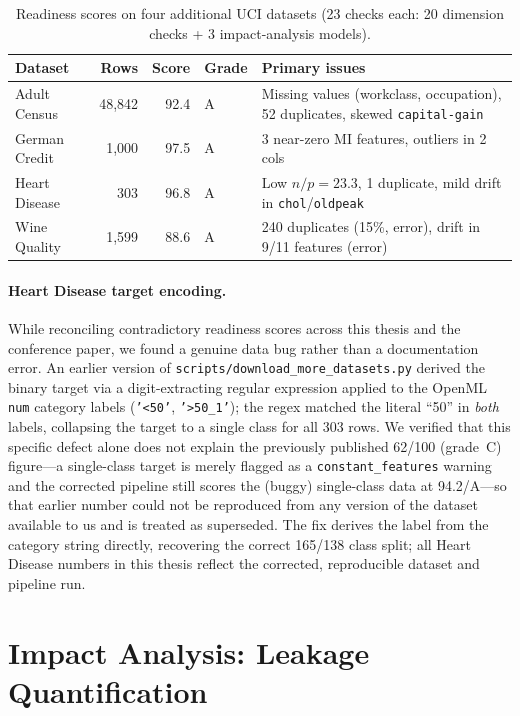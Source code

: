 \documentclass[12pt,a4paper]{report}
\newcommand{\tblhead}{\rowcolor{tblHeadBg}\color{white}\bfseries}
\begin{document}
\begin{table}[!ht]
\centering
\caption{Readiness scores on four additional UCI datasets (23 checks each: 20 dimension
  checks + 3 impact-analysis models).}
\label{tab:uci}
\begin{tabularx}{\textwidth}{lrrlX}
\toprule
\tblhead \textbf{Dataset} & \textbf{Rows} & \textbf{Score} & \textbf{Grade} & \textbf{Primary issues} \\
\midrule
Adult Census     & 48,842 & 92.4 & A & Missing values (workclass, occupation), 52 duplicates, skewed \texttt{capital-gain} \\
German Credit    & 1,000  & 97.5 & A & 3 near-zero MI features, outliers in 2 cols \\
Heart Disease    & 303    & 96.8 & A & Low $n/p{=}23.3$, 1 duplicate, mild drift in \texttt{chol}/\texttt{oldpeak} \\
Wine Quality     & 1,599  & 88.6 & A & 240 duplicates (15\%, error), drift in 9/11 features (error) \\
\bottomrule
\end{tabularx}
\end{table}

\paragraph{Heart Disease target encoding.}
While reconciling contradictory readiness scores across this thesis and the conference
paper, we found a genuine data bug rather than a documentation error.  An earlier version
of \texttt{scripts/download\_more\_datasets.py} derived the binary target via a
digit-extracting regular expression applied to the OpenML \texttt{num} category labels
(\texttt{'<50'}, \texttt{'>50\_1'}); the regex matched the literal ``50'' in \emph{both}
labels, collapsing the target to a single class for all 303 rows.  We verified that this
specific defect alone does not explain the previously published 62/100 (grade~C) figure---a
single-class target is merely flagged as a \texttt{constant\_features} warning and the
corrected pipeline still scores the (buggy) single-class data at 94.2/A---so that earlier
number could not be reproduced from any version of the dataset available to us and is
treated as superseded.  The fix derives the label from the category string directly,
recovering the correct 165/138 class split; all Heart Disease numbers in this thesis
reflect the corrected, reproducible dataset and pipeline run.

\section{Impact Analysis: Leakage Quantification}
\label{sec:impactresults}
\end{document}
